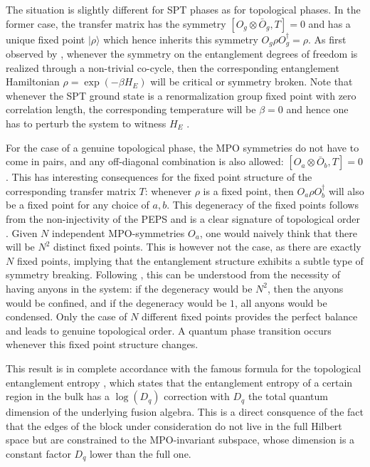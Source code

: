 \documentclass[rmp,aps,reprint,superscriptaddress,nobalancelastpage]{revtex4-1}
\begin{document}
    The situation is slightly different for SPT phases as for topological phases. In the former case, the transfer matrix has the symmetry $[O_g\otimes \bar{O}_g,T]=0$ and has a unique fixed point $|\rho\rangle$ which hence inherits this symmetry $O_g\rho O_g^\dagger=\rho$. As first observed by \citet{chen:2d-spt-phases-peps-ghz}, whenever the symmetry on the entanglement degrees of freedom is realized through a non-trivial co-cycle, then the corresponding entanglement Hamiltonian $\rho=\exp(-\beta H_E)$ will be critical or symmetry broken. Note that whenever the SPT ground state is a renormalization group fixed point with zero correlation length, the corresponding temperature will be $\beta=0$ and hence one has to perturb the system to witness $H_E$ \cite{bultinck2018global}.

    For the case of a genuine topological phase, the MPO symmetries do not have to come in pairs, and any off-diagonal combination is also allowed: $[O_a\otimes \bar{O}_b,T]=0$. This has interesting consequences for the fixed point structure of the corresponding transfer matrix $T$: whenever $\rho$ is a fixed point, then $O_a\rho O_b^\dagger$ will also be a fixed point for any choice of $a,b$. This degeneracy of the fixed points follows from the non-injectivity of the PEPS and is a clear signature
    of topological order \cite{schuch:topo-top}. Given $N$ independent MPO-symmetries $O_a$, one would naively think that there will be $N^2$ distinct fixed points. This is however not the case, as there are exactly $N$ fixed points, implying that the entanglement structure exhibits a subtle type of symmetry breaking. Following \cite{haegeman:shadows}, this can be understood from the necessity of having anyons in the system: if the degeneracy would be $N^2$, then the anyons would be confined, and if the degeneracy would be $1$, all anyons would be condensed. Only the case of $N$ different fixed points provides the perfect balance and leads to genuine topological order. A quantum phase transition occurs whenever this fixed point structure changes.

    This result is in complete accordance with the famous formula for the topological entanglement entropy \cite{kitaev:topological-entropy,levin:topological-entropy}, which states that the entanglement entropy of a certain region in the bulk has a $\log(D_q)$ correction with $D_q$ the total quantum dimension of the underlying fusion algebra. This is a direct consquence of the fact that the edges of the block under consideration do not live in the full Hilbert space but are constrained to the MPO-invariant subspace, whose dimension is a constant factor $D_q$ lower than the full one.
\end{document}
